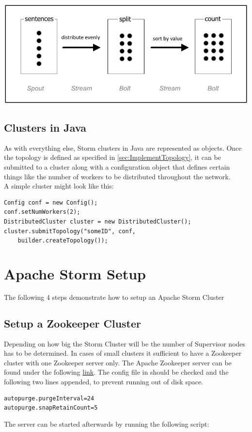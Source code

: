 \documentclass[12pt,a4paper]{article}
\begin{document}
\includegraphics[width=\textwidth]{images/WordCountGraph.png} 

\subsection{Clusters in Java}
\label{sec:ImplementCluster}
As with everything else, Storm clusters in Java are represented as objects. Once the topology is defined as specified in \ref{sec:ImplementTopology}, it can be submitted to a cluster along with a configuration object that defines certain things like the number of workers to be distributed throughout the network.\\

A simple cluster might look like this:
\begin{lstlisting}
Config conf = new Config();
conf.setNumWorkers(2);
DistributedCluster cluster = new DistributedCluster();
cluster.submitTopology("someID", conf,
    builder.createTopology());
\end{lstlisting}
\section{Apache Storm Setup}
The following 4 steps demonstrate how to setup an Apache Storm Cluster
\subsection{Setup a Zookeeper Cluster}
Depending on how big the Storm Cluster will be the number of Supervisor nodes has to be determined. In cases of small clusters it sufficient to have a Zookeeper cluster with one Zookeeper server only.
The Apache Zookeeper server can be found under the following \href{http://www.eu.apache.org/dist/zookeeper/stable/}{link}. The config file in  should be checked and the following two lines appended, to prevent running out of disk space.
\begin{verbatim}
autopurge.purgeInterval=24
autopurge.snapRetainCount=5  
\end{verbatim}
The server can be started afterwards by running the following script: 
\end{document}
